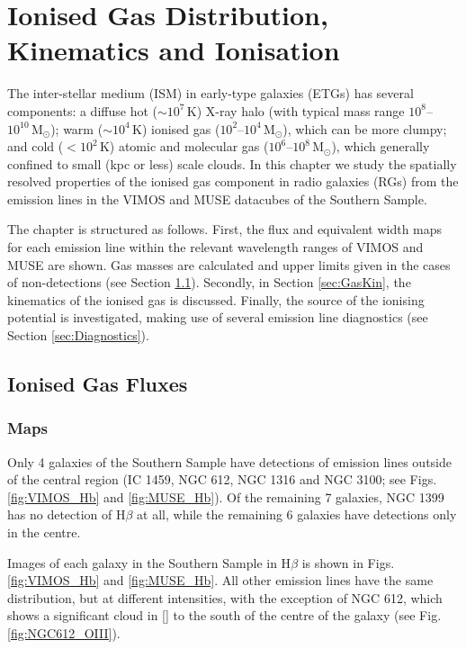 \chapter{Ionised Gas Distribution, Kinematics and Ionisation}
	\label{cha:gas}
The inter-stellar medium (ISM) in early-type galaxies (ETGs) has several components: a diffuse hot ($\sim 10^7 \, \mathrm{K}$) X-ray halo (with typical mass range $10^8$--$10^{10} \, \mathrm{M_\odot}$); warm ($\sim 10^4 \, \mathrm{K}$) ionised gas ($10^2$--$10^4 \, \mathrm{M_\odot}$), which can be more clumpy; and cold ($<10^2 \, \mathrm{K}$) atomic and molecular gas ($10^6$--$10^8 \, \mathrm{M_\odot}$), which generally confined to small (kpc or less) scale clouds. In this chapter we study the spatially resolved properties of the ionised gas component in radio galaxies (RGs) from the emission lines in the VIMOS and MUSE datacubes of the Southern Sample.

The chapter is structured as follows. First, the flux and equivalent width maps for each emission line within the relevant wavelength ranges of VIMOS and MUSE are shown. Gas masses are calculated and upper limits given in the cases of non-detections (see Section \ref{sec:GasFlux}). Secondly, in Section \ref{sec:GasKin}, the kinematics of the ionised gas is discussed. Finally, the source of the ionising potential is investigated, making use of several emission line diagnostics (see Section \ref{sec:Diagnostics}).


\section{Ionised Gas Fluxes}
	\label{sec:GasFlux}
	\subsection{Maps}
		\label{subsec:GasMaps}
		Only 4 galaxies of the Southern Sample have detections of emission lines outside of the central region (IC 1459, NGC 612, NGC 1316 and NGC 3100; see Figs.\ref{fig:VIMOS_Hb} and \ref{fig:MUSE_Hb}).  Of the remaining 7 galaxies, NGC 1399 has no detection of H$\beta$ at all, while the remaining 6 galaxies have detections only in the centre. 

		Images of each galaxy in the Southern Sample in H$\beta$ is shown in Figs.\ref{fig:VIMOS_Hb} and \ref{fig:MUSE_Hb}. All other emission lines have the same distribution, but at different intensities, with the exception of NGC 612, which shows a significant cloud in [] to the south of the centre of the galaxy (see Fig.\ref{fig:NGC612_OIII}). 


